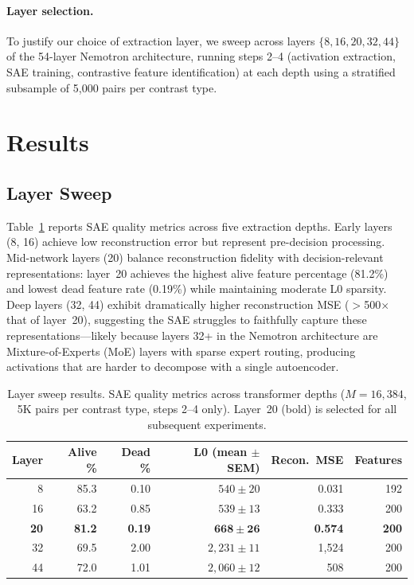 \documentclass[runningheads]{llncs}
\begin{document}
\paragraph{Layer selection.} To justify our choice of extraction layer, we sweep across layers $\{8, 16, 20, 32, 44\}$ of the 54-layer Nemotron architecture, running steps 2--4 (activation extraction, SAE training, contrastive feature identification) at each depth using a stratified subsample of 5,000 pairs per contrast type.

\section{Results}
\label{sec:results}

\subsection{Layer Sweep}

Table~\ref{tab:layer_sweep} reports SAE quality metrics across five extraction depths. Early layers (8, 16) achieve low reconstruction error but represent pre-decision processing. Mid-network layers (20) balance reconstruction fidelity with decision-relevant representations: layer~20 achieves the highest alive feature percentage (81.2\%) and lowest dead feature rate (0.19\%) while maintaining moderate L0 sparsity. Deep layers (32, 44) exhibit dramatically higher reconstruction MSE ($>$500$\times$ that of layer~20), suggesting the SAE struggles to faithfully capture these representations---likely because layers 32+ in the Nemotron architecture are Mixture-of-Experts (MoE) layers with sparse expert routing, producing activations that are harder to decompose with a single autoencoder.

\begin{table}[t]
\caption{Layer sweep results. SAE quality metrics across transformer depths ($M = 16{,}384$, 5K pairs per contrast type, steps 2--4 only). Layer~20 (bold) is selected for all subsequent experiments.}
\label{tab:layer_sweep}
\centering
\begin{tabular}{rrrrrr}
\toprule
Layer & Alive \% & Dead \% & L0 (mean $\pm$ SEM) & Recon.\ MSE & Features \\
\midrule
8  & 85.3 & 0.10 & $540 \pm 20$   & 0.031   & 192 \\
16 & 63.2 & 0.85 & $539 \pm 13$   & 0.333   & 200 \\
\textbf{20} & \textbf{81.2} & \textbf{0.19} & $\mathbf{668 \pm 26}$ & \textbf{0.574} & \textbf{200} \\
32 & 69.5 & 2.00 & $2{,}231 \pm 11$ & 1{,}524 & 200 \\
44 & 72.0 & 1.01 & $2{,}060 \pm 12$ & 508     & 200 \\
\bottomrule
\end{tabular}
\end{table}
\end{document}
